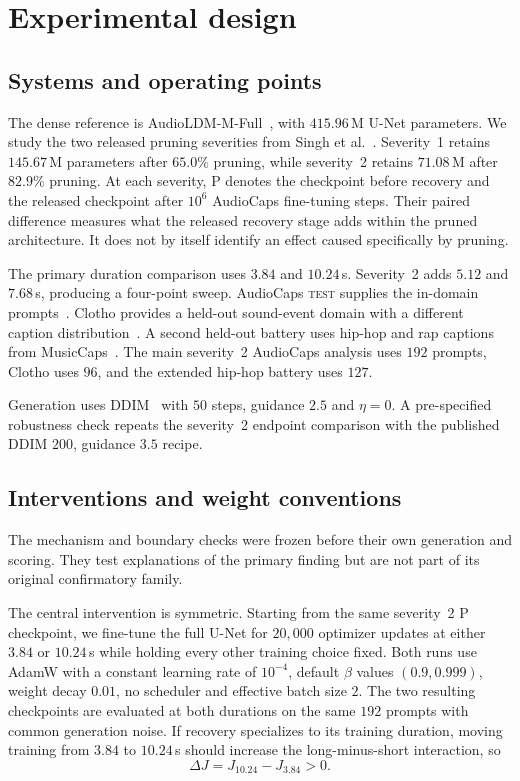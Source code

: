 \section{Experimental design}
\subsection{Systems and operating points}
The dense reference is AudioLDM-M-Full~\cite{liu2023audioldm}, with $415.96$\,M U-Net parameters. We study the two released pruning severities from Singh et al.~\cite{singh2026pruning}. Severity~1 retains $145.67$\,M parameters after $65.0\%$ pruning, while severity~2 retains $71.08$\,M after $82.9\%$ pruning. At each severity, P denotes the checkpoint before recovery and \PFT{} the released checkpoint after $10^{6}$ AudioCaps fine-tuning steps. Their paired difference measures what the released recovery stage adds within the pruned architecture. It does not by itself identify an effect caused specifically by pruning.

The primary duration comparison uses $3.84$ and $10.24$\,s. Severity~2 adds $5.12$ and $7.68$\,s, producing a four-point sweep. AudioCaps \textsc{test} supplies the in-domain prompts~\cite{kim2019audiocaps}. Clotho provides a held-out sound-event domain with a different caption distribution~\cite{drossos2020clotho}. A second held-out battery uses hip-hop and rap captions from MusicCaps~\cite{agostinelli2023musiclm}. The main severity~2 AudioCaps analysis uses $192$ prompts, Clotho uses $96$, and the extended hip-hop battery uses $127$.

Generation uses DDIM~\cite{song2021ddim} with $50$ steps, guidance $2.5$ and $\eta=0$. A pre-specified robustness check repeats the severity~2 endpoint comparison with the published DDIM $200$, guidance $3.5$ recipe.

\subsection{Interventions and weight conventions}
The mechanism and boundary checks were frozen before their own generation and scoring. They test explanations of the primary finding but are not part of its original confirmatory family.

The central intervention is symmetric. Starting from the same severity~2 P checkpoint, we fine-tune the full U-Net for $20{,}000$ optimizer updates at either $3.84$ or $10.24$\,s while holding every other training choice fixed. Both runs use AdamW with a constant learning rate of $10^{-4}$, default $\beta$ values $(0.9,0.999)$, weight decay $0.01$, no scheduler and effective batch size $2$. The two resulting checkpoints are evaluated at both durations on the same $192$ prompts with common generation noise. If recovery specializes to its training duration, moving training from $3.84$ to $10.24$\,s should increase the long-minus-short interaction, so
\begin{equation}
\Delta J = J_{10.24}-J_{3.84}>0.
\end{equation}

